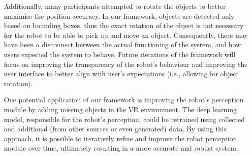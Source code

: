 \documentclass[letterpaper, 10 pt, conference]{ieeeconf}  %
\begin{document}
Additionally, many participants attempted to rotate the objects to better maximise the position accuracy. In our framework, objects are detected only based on bounding boxes, thus the exact rotation of the object is not necessary for the robot to be able to pick up and move an object. Consequently, there may have been a disconnect between the actual functioning of the system, and how users expected the system to behave. Future iterations of the framework will focus on improving the transparency of the robot's behaviour and improving the user interface to better align with user's expectations (i.e., allowing for object rotation).

One potential application of our framework is improving the robot's perception module by adding missing objects in the VR environment. 
The deep learning model, responsible for the robot's perception, could be retrained using collected and additional (from other sources or even generated) data. By using this approach, it is possible to iteratively refine and improve the robot perception module over time, ultimately resulting in a more accurate and robust system.



\end{document}
